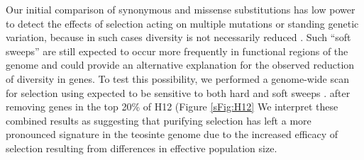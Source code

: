 \documentclass{pnastwo}
\begin{document}
\begin{article}
Our initial comparison of synonymous and missense substitutions has low power to detect the effects of selection acting on multiple mutations or standing genetic variation, because in such cases diversity is not necessarily reduced \cite{innan2004,messer2013}. 
Such ``soft sweeps'' \DIFdelbegin {}\DIFdelend are still expected to occur more frequently in functional regions of the genome and could provide an alternative explanation for the observed reduction of diversity in genes. 
To test this possibility, we performed a genome-wide scan for selection using \DIFdelbegin {}\DIFdelend \DIFaddbegin {}\DIFaddend expected to be \DIFdelbegin {}\DIFdelend sensitive to both hard and soft sweeps \cite{garud2015}. 
\DIFdelbegin {}\DIFdelend \DIFaddbegin {}\DIFaddend after removing genes in the top 20\% of \DIFdelbegin {}\DIFdelend H12 \DIFdelbegin {}\DIFdelend (Figure \ref{sFig:H12}\DIFdelbegin {}
\DIFdelend \DIFaddbegin {}\DIFaddend We interpret these combined results as suggesting that purifying selection has left a more pronounced signature in the teosinte genome due to the increased efficacy of selection resulting from differences in effective population size.


\end{article}
\end{document}
